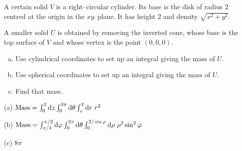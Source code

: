 \begin{question}[M200 2007A] %
A certain solid $V$ is a right--circular cylinder. Its base is
the disk of radius $2$ centred at the origin in the $xy$--plane. 
It has height $2$ and density $\sqrt{x^2 + y^2}$.

A smaller solid $U$ is obtained by removing the inverted cone, 
whose base is the top surface of $V$ and whose vertex is the point $(0, 0, 0)$.

\begin{enumerate}[(a)]
\item 
    Use cylindrical coordinates to set up an integral giving the mass of $U$.
\item 
   Use spherical coordinates to set up an integral giving the mass of $U$.
\item
  Find that mass.
\end{enumerate}
\end{question}

%

\begin{answer}
(a) $\text{Mass} = \int_0^2\dee{z}\int_0^{2\pi}\dee{\theta}\int_z^2\dee{r}\ 
                                  r^2$

(b) $\text{Mass} =  \int_{\pi/4}^{\pi/2}\dee{\varphi}\int_0^{2\pi}\dee{\theta}
            \int_0^{2/\sin\varphi}\dee{\rho}\ 
                  \rho^3\sin^2\varphi$

(c) $8\pi$
\end{answer}


